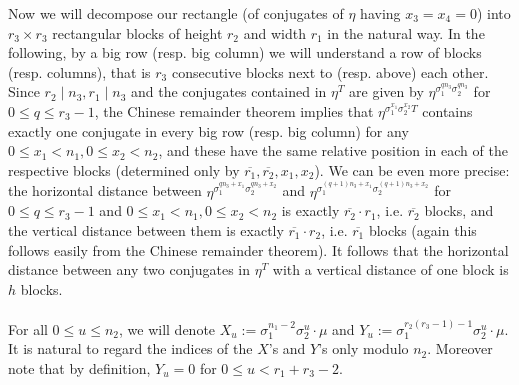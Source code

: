 \documentclass[12pt,a4paper]{article}
\theoremstyle{definition}
\newcommand{\uo}{\overline{r_2}}
\newcommand{\vo}{\overline{r_1}}
\begin{document}
Now we will decompose our rectangle (of conjugates of $\eta$ having $x_3=x_4=0$) into $r_3\times r_3$ rectangular blocks of height $r_2$ and width $r_1$ in the natural way. In the following, by a big row (resp. big column) we will understand a row of blocks (resp. columns), that is $r_3$ consecutive blocks next to (resp. above) each other. Since $r_2\mid n_3, r_1\mid n_3$ and the conjugates contained in $\eta^T$ are given by $\eta^{\sigma_1^{qn_3}\sigma_2^{qn_3}}$ for $0\leq q \leq r_3-1$, the Chinese remainder theorem implies that $\eta^{\sigma_1^{x_1}\sigma_2^{x_2}T}$ contains exactly one conjugate in every big row (resp. big column) for any $0\leq x_1< n_1, 0\leq x_2< n_2$, and these have the same relative position in each of the respective blocks (determined only by $\vo,\uo,x_1,x_2$). We can be even more precise: the horizontal distance between $\eta^{\sigma_1^{qn_3+x_1}\sigma_2^{qn_3+x_2}}$ and $\eta^ {\sigma_1^{(q+1)n_3+x_1}\sigma_2^{(q+1)n_3+x_2}}$ for $0\leq q \leq r_3-1$ and $0\leq x_1< n_1, 0\leq x_2< n_2$ is exactly $\uo\cdot r_1$, i.e. $\uo$ blocks, and the vertical distance between them is exactly $\vo\cdot r_2$, i.e. $\vo$ blocks (again this follows easily from the Chinese remainder theorem). It follows that the horizontal distance between any two conjugates in $\eta^T$ with a vertical distance of one block is $h$ blocks.

\paragraph*{}
For all $0\leq u\leq n_2$, we will denote $X_u:=\sigma_1^{n_1-2}\sigma_2^{u}\cdot \mu$ and $Y_u:=\sigma_1^{r_2(r_3-1)-1}\sigma_2^u\cdot \mu$. It is natural to regard the indices of the $X$'s and $Y$'s only modulo $n_2$. Moreover note that by definition, $Y_u=0$ for $0\leq u< r_1+r_3-2$. 
\end{document}
